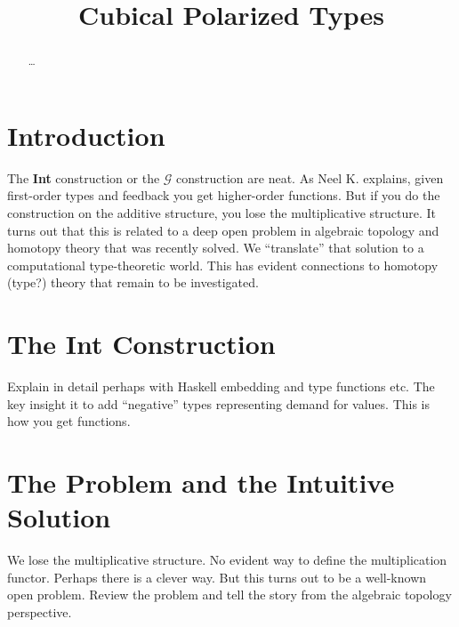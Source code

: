 \documentclass[authoryear,preprint]{sigplanconf}
\begin{document}
\lstset{breaklines=true, breakatwhitespace=true}
\lstset{numbers=none, numbersep=5pt, stepnumber=2, numberstyle=\scriptsize}
\lstset{rangeprefix=/*!\ , rangesuffix=\ !*\/, includerangemarker=false}

\title{Cubical Polarized Types}
\authorinfo{}{}{}
\maketitle

\begin{abstract}
\ldots
\end{abstract}

\section{Introduction}

The \textbf{Int} construction or the $\mathcal{G}$ construction are neat. As
Neel K. explains, given first-order types and feedback you get higher-order
functions. But if you do the construction on the additive structure, you lose
the multiplicative structure. It turns out that this is related to a deep
open problem in algebraic topology and homotopy theory that was recently
solved. We ``translate'' that solution to a computational type-theoretic
world. This has evident connections to homotopy (type?) theory that remain to
be investigated.

\section{The \textbf{Int} Construction} 

Explain in detail perhaps with Haskell embedding and type functions etc. The
key insight it to add ``negative'' types representing demand for values. This
is how you get functions.

\section{The Problem and the Intuitive Solution}

We lose the multiplicative structure. No evident way to define the
multiplication functor. Perhaps there is a clever way. But this turns out to
be a well-known open problem. Review the problem and tell the story from the
algebraic topology perspective.
\end{document}
